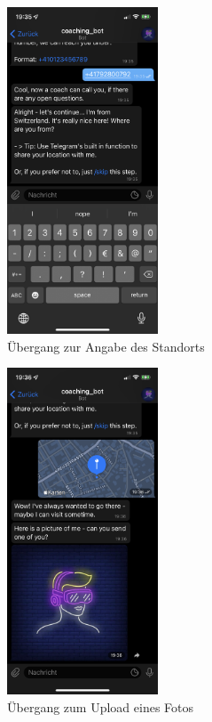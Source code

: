 	\begin{figure}
		\centering
		\includegraphics[width=0.4\textwidth]{images/Screenshots/location.PNG}
		\caption{Übergang zur Angabe des Standorts}
		\label{fig: scs..location}
	\end{figure}


	\begin{figure}
		\centering
		\includegraphics[width=0.4\textwidth]{images/Screenshots/photo.PNG}
		\caption{Übergang zum Upload eines Fotos}
		\label{fig: scs..photo}
	\end{figure}


